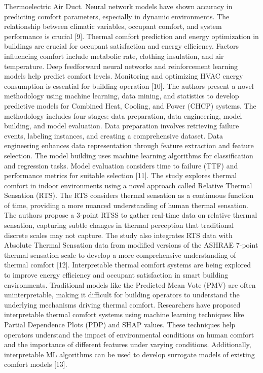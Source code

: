 \begin{multicols}{2}
Thermoelectric Air Duct. Neural network models have shown accuracy in
predicting comfort parameters, especially in dynamic environments. The
relationship between climatic variables, occupant comfort, and system
performance is crucial {[}9{]}. Thermal comfort prediction and energy
optimization in buildings are crucial for occupant satisfaction and
energy efficiency. Factors influencing comfort include metabolic rate,
clothing insulation, and air temperature. Deep feedforward neural
networks and reinforcement learning models help predict comfort levels.
Monitoring and optimizing HVAC energy consumption is essential for
building operation {[}10{]}. The authors present a novel methodology
using machine learning, data mining, and statistics to develop
predictive models for Combined Heat, Cooling, and Power (CHCP) systems.
The methodology includes four stages: data preparation, data
engineering, model building, and model evaluation. Data preparation
involves retrieving failure events, labeling instances, and creating a
comprehensive dataset. Data engineering enhances data representation
through feature extraction and feature selection. The model building
uses machine learning algorithms for classification and regression
tasks. Model evaluation considers time to failure (TTF) and performance
metrics for suitable selection {[}11{]}. The study explores thermal
comfort in indoor environments using a novel approach called Relative
Thermal Sensation (RTS). The RTS considers thermal sensation as a
continuous function of time, providing a more nuanced understanding of
human thermal sensation. The authors propose a 3-point RTSS to gather
real-time data on relative thermal sensation, capturing subtle changes
in thermal perception that traditional discrete scales may not capture.
The study also integrates RTS data with Absolute Thermal Sensation data
from modified versions of the ASHRAE 7-point thermal sensation scale to
develop a more comprehensive understanding of thermal comfort {[}12{]}.
Interpretable thermal comfort systems are being explored to improve
energy efficiency and occupant satisfaction in smart building
environments. Traditional models like the Predicted Mean Vote (PMV) are
often uninterpretable, making it difficult for building operators to
understand the underlying mechanisms driving thermal comfort.
Researchers have proposed interpretable thermal comfort systems using
machine learning techniques like Partial Dependence Plots (PDP) and SHAP
values. These techniques help operators understand the impact of
environmental conditions on human comfort and the importance of
different features under varying conditions. Additionally, interpretable
ML algorithms can be used to develop surrogate models of existing
comfort models {[}13{]}.


\end{multicols}
